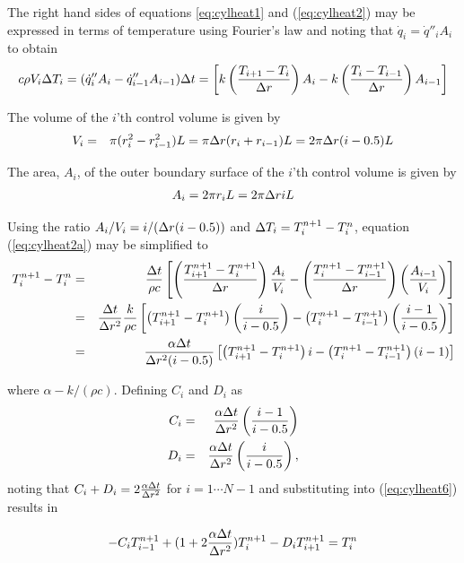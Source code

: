 The right hand sides of equations \ref{eq:cylheat1} and (\ref{eq:cylheat2}) may be expressed in terms of temperature using
Fourier's law and noting that $\dot{q}_i=\dot{q}''_iA_i$ to obtain
\begin{equation}
c\rho V_i\Delta T_i=(\dot{q}''_iA_i-\dot{q}''_{i-1}A_{i-1})\Delta t
=
\left[
k\left(\frac{T_{i+1}-T_i}{\Delta r}\right)A_i-k\left(\frac{T_{i}-T_{i-1}}{\Delta r}\right)A_{i-1}
\right]
\label{eq:cylheat2a}
\end{equation}

\noindent The volume of the $i$'th control volume is given by
\begin{eqnarray*}
V_i&=&\pi(r_i^2-r_{i-1}^2)L
=\pi\Delta r(r_i+r_{i-1})L
=2\pi\Delta r(i-0.5) L
\label{eq:cylheat3}
\end{eqnarray*}

\noindent The area, $A_i$, of the outer boundary surface of the $i$'th
control volume is given by
\begin{eqnarray*}
A_i=2\pi r_iL
=2\pi \Delta r iL
\label{eq:cylheat4}
\end{eqnarray*}

\noindent Using the ratio $A_i/V_i=i/(\Delta r(i-0.5))$
and $\Delta T_i=T_{i}^{n+1}-T_i^n$,
equation (\ref{eq:cylheat2a}) may be simplified to
\begin{eqnarray}
T_{i}^{n+1}-T_i^n&=&\frac{\Delta t}{\rho c}
\left[
\left(\frac{T_{i+1}^{n+1}-T_{i}^{n+1}}{\Delta r}\right)
\frac{A_i}{V_i}-
\left(\frac{T_{i}^{n+1}-T_{i-1}^{n+1}}{\Delta r}\right)
\left(\frac{A_{i-1}}{V_i}\right)
\right]
\nonumber\\
&=&\frac{\Delta t}{\Delta r^2}\frac{k}{\rho c}
\left[
\left(T_{i+1}^{n+1}-T_{i}^{n+1}\right)
\left(\frac{i}{i-0.5}\right)-
\left(T_{i}^{n+1}-T_{i-1}^{n+1}\right)
\left(\frac{i-1}{i-0.5}\right)
\right]\nonumber\\
&=&\frac{\alpha\Delta t}{\Delta r^2(i-0.5)}
\left[
\left(T_{i+1}^{n+1}-T_{i}^{n+1}\right)
i-
\left(T_{i}^{n+1}-T_{i-1}^{n+1}\right)
(i-1)
\right]
\label{eq:cylheat6}
\end{eqnarray}

\noindent where $\alpha-k/(\rho c)$.  Defining $C_i$ and $D_i$ as
\begin{eqnarray*}
C_i&=&\frac{\alpha\Delta t}{\Delta r^2}\left(\frac{i-1}{i-0.5}\right)\\
D_i&=&\frac{\alpha\Delta t}{\Delta r^2}\left(\frac{i}{i-0.5}\right),\\
\end{eqnarray*}
\noindent noting that $C_i+D_i=2\frac{\alpha\Delta t}{\Delta r^2}$
for $i=1\cdots N-1$ and
substituting into (\ref{eq:cylheat6}) results in

\begin{equation}
-C_iT_{i-1}^{n+1}+(1+2\frac{\alpha\Delta t}{\Delta r^2})T_{i}^{n+1}-D_iT_{i+1}^{n+1}=T_i^n
\label{eq:cylheat8}
\end{equation}

